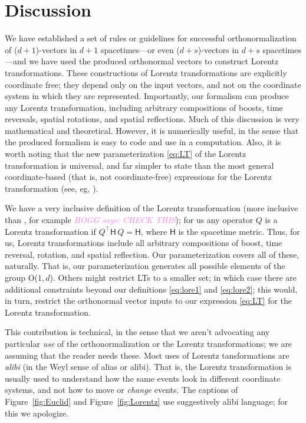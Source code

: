 \documentclass{article}
\newcommand{\metric}{\mathsf{H}}
\newcommand{\plus}{\!+\!} %
\newcommand{\figref}[1]{Figure~\ref{#1}}
\newcommand{\HOGG}[1]{\textcolor{violet}{\textsl{HOGG says: {#1}}}}
\begin{document}
\section{Discussion}\label{sec:discussion}

We have established a set of rules or guidelines for successful orthonormalization of ($d\plus1$)-vectors in $d\plus1$ spacetimes---or even ($d\plus s$)-vectors in $d\plus s$ spacetimes---and we have used the produced orthonormal vectors to construct Lorentz transformations.
These constructions of Lorentz transformations are explicitly coordinate free; they depend only on the input vectors, and not on the coordinate system in which they are represented.
Importantly, our formalism can produce any Lorentz transformation, including arbitrary compositions of boosts, time reversals, spatial rotations, and spatial reflections.
Much of this discussion is very mathematical and theoretical.
However, it is numerically useful, in the sense that the produced formalism is easy to code and use in a computation.
Also, it is worth noting that the new parameterization \eqref{eq:LT} of the Lorentz transformation is universal, and far simpler to state than the most general coordinate-based (that is, not coordinate-free) expressions for the Lorentz transformation (see, eg, \cite{haber}).

We have a very inclusive definition of the Lorentz transformation (more inclusive than \cite{haber}, for example \HOGG{CHECK THIS}); for us any operator $Q$ is a Lorentz transformation if $Q^\top\metric\,Q=\metric$, where $\metric$ is the spacetime metric.
Thus, for us, Lorentz transformations include all arbitrary compositions of boost, time reversal, rotation, and spatial reflection.
Our parameterization covers all of these, naturally.
That is, our parameterization generates all possible elements of the group O($1,d$).
Others might restrict LTs to a smaller set; in which case there are additional constraints beyond our definitions \eqref{eq:lore1} and \eqref{eq:lore2}; this would, in turn, restrict the orthonormal vector inputs to our expression \eqref{eq:LT} for the Lorentz transformation.

This contribution is technical, in the sense that we aren't advocating any particular \emph{use} of the orthonormalization or the Lorentz transformations; we are assuming that the reader needs these.
Most uses of Lorentz tansformations are \emph{alibi} (in the Weyl \cite{weyl} sense of alias or alibi).
That is, the Lorentz transformation is usually used to understand how the same events look in different coordinate systems, and not how to move or \emph{change} events.
The captions of \figref{fig:Euclid} and \figref{fig:Lorentz} use suggestively alibi language; for this we apologize.
\end{document}
